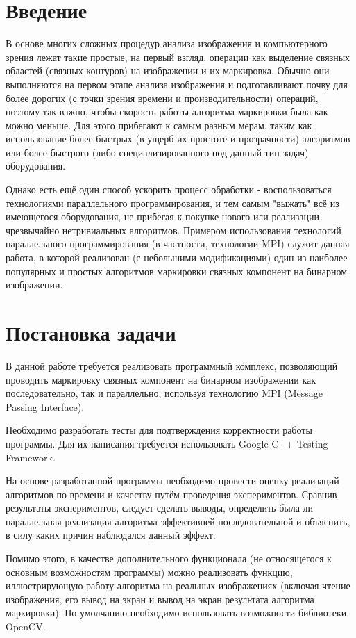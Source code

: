 \documentclass{report}
\begin{document}
	\setcounter{page}{2}


	\tableofcontents
	\newpage


	\section*{Введение}
		\par В основе многих сложных процедур анализа изображения и компьютерного зрения лежат такие простые, на первый взгляд, операции как выделение связных областей (связных контуров) на изображении и их маркировка. Обычно они выполняются на первом этапе анализа изображения и подготавливают почву для более дорогих (с точки зрения времени и производительности) операций, поэтому так важно, чтобы скорость работы алгоритма маркировки была как можно меньше. Для этого прибегают к самым разным мерам, таким как использование более быстрых (в ущерб их простоте и прозрачности) алгоритмов или более быстрого (либо специализированного под данный тип задач) оборудования.
		\par Однако есть ещё один способ ускорить процесс обработки - воспользоваться технологиями параллельного программирования, и тем самым "выжать" всё из имеющегося оборудования, не прибегая к покупке нового или реализации чрезвычайно нетривиальных алгоритмов. Примером использования технологий параллельного программирования (в частности, технологии MPI) служит данная работа, в которой реализован (с небольшими модификациями) один из наиболее популярных и простых алгоритмов маркировки связных компонент на бинарном изображении.
	\newpage


	\section*{Постановка задачи}
		\par В данной работе требуется реализовать программный комплекс, позволяющий проводить маркировку связных компонент на бинарном изображении как последовательно, так и параллельно, используя технологию MPI (Message Passing Interface).
		\par Необходимо разработать тесты для подтверждения корректности работы программы. Для их написания требуется использовать Google C++ Testing Framework.
		\par На основе разработанной программы необходимо провести оценку реализаций алгоритмов по времени и качеству путём проведения экспериментов. Сравнив результаты экспериментов, следует сделать выводы, определить была ли параллельная реализация алгоритма эффективней последовательной и объяснить, в силу каких причин наблюдался данный эффект.
		\par Помимо этого, в качестве дополнительного функционала (не относящегося к основным возможностям программы) можно реализовать функцию, иллюстрирующую работу алгоритма на реальных изображениях (включая чтение изображения, его вывод на экран и вывод на экран результата алгоритма маркировки). По умолчанию необходимо использовать возможности библиотеки OpenCV.
	\newpage
\end{document}
